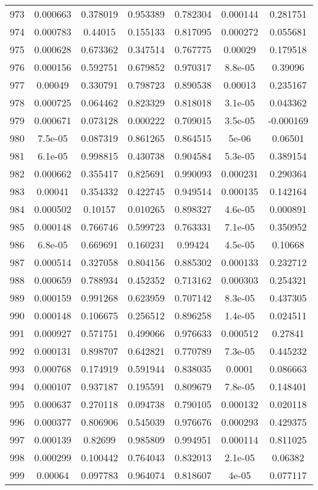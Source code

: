 \begin{table}
\begin{tabular}{c|c|c|c|c|c|c}
973 & 0.000663 & 0.378019 & 0.953389 & 0.782304 & 0.000144 & 0.281751\\
974 & 0.000783 & 0.44015 & 0.155133 & 0.817095 & 0.000272 & 0.055681\\
975 & 0.000628 & 0.673362 & 0.347514 & 0.767775 & 0.00029 & 0.179518\\
976 & 0.000156 & 0.592751 & 0.679852 & 0.970317 & 8.8e-05 & 0.39096\\
977 & 0.00049 & 0.330791 & 0.798723 & 0.890538 & 0.00013 & 0.235167\\
978 & 0.000725 & 0.064462 & 0.823329 & 0.818018 & 3.1e-05 & 0.043362\\
979 & 0.000671 & 0.073128 & 0.000222 & 0.709015 & 3.5e-05 & -0.000169\\
980 & 7.5e-05 & 0.087319 & 0.861265 & 0.864515 & 5e-06 & 0.06501\\
981 & 6.1e-05 & 0.998815 & 0.430738 & 0.904584 & 5.3e-05 & 0.389154\\
982 & 0.000662 & 0.355417 & 0.825691 & 0.990093 & 0.000231 & 0.290364\\
983 & 0.00041 & 0.354332 & 0.422745 & 0.949514 & 0.000135 & 0.142164\\
984 & 0.000502 & 0.10157 & 0.010265 & 0.898327 & 4.6e-05 & 0.000891\\
985 & 0.000148 & 0.766746 & 0.599723 & 0.763331 & 7.1e-05 & 0.350952\\
986 & 6.8e-05 & 0.669691 & 0.160231 & 0.99424 & 4.5e-05 & 0.10668\\
987 & 0.000514 & 0.327058 & 0.804156 & 0.885302 & 0.000133 & 0.232712\\
988 & 0.000659 & 0.788934 & 0.452352 & 0.713162 & 0.000303 & 0.254321\\
989 & 0.000159 & 0.991268 & 0.623959 & 0.707142 & 8.3e-05 & 0.437305\\
990 & 0.000148 & 0.106675 & 0.256512 & 0.896258 & 1.4e-05 & 0.024511\\
991 & 0.000927 & 0.571751 & 0.499066 & 0.976633 & 0.000512 & 0.27841\\
992 & 0.000131 & 0.898707 & 0.642821 & 0.770789 & 7.3e-05 & 0.445232\\
993 & 0.000768 & 0.174919 & 0.591944 & 0.838035 & 0.0001 & 0.086663\\
994 & 0.000107 & 0.937187 & 0.195591 & 0.809679 & 7.8e-05 & 0.148401\\
995 & 0.000637 & 0.270118 & 0.094738 & 0.790105 & 0.000132 & 0.020118\\
996 & 0.000377 & 0.806906 & 0.545039 & 0.976676 & 0.000293 & 0.429375\\
997 & 0.000139 & 0.82699 & 0.985809 & 0.994951 & 0.000114 & 0.811025\\
998 & 0.000299 & 0.100442 & 0.764043 & 0.832013 & 2.1e-05 & 0.06382\\
999 & 0.00064 & 0.097783 & 0.964074 & 0.818607 & 4e-05 & 0.077117\\
\end{tabular}
\end{table}